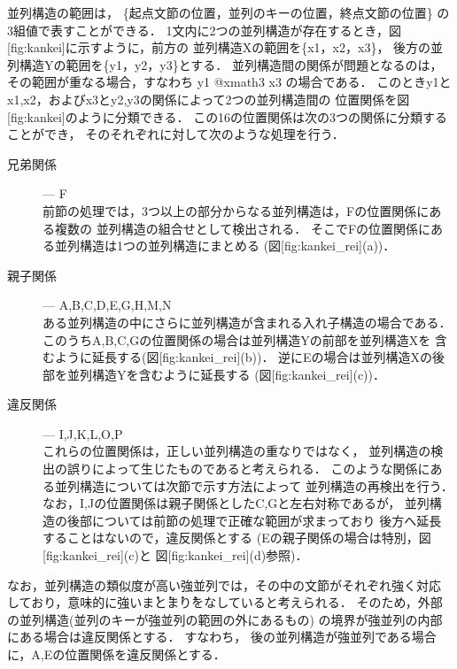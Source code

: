 並列構造の範囲は，
\{起点文節の位置，並列のキーの位置，終点文節の位置\}
の3組値で表すことができる．
1文内に2つの並列構造が存在するとき，図[fig:kankei]に示すように，前方の
並列構造Xの範囲を\{x1，x2，x3\}，
後方の並列構造Yの範囲を\{y1，y2，y3\}とする．
並列構造間の関係が問題となるのは，その範囲が重なる場合，すなわち 
y1 @xmath3 x3 
の場合である．
このときy1とx1,x2，およびx3とy2,y3の関係によって2つの並列構造間の
位置関係を図[fig:kankei]のように分類できる．
この16の位置関係は次の3つの関係に分類することができ，
そのそれぞれに対して次のような処理を行う．
\begin{description}
  \item[兄弟関係] --- F \\
前節の処理では，3つ以上の部分からなる並列構造は，Fの位置関係にある複数の
並列構造の組合せとして検出される．
そこでFの位置関係にある並列構造は1つの並列構造にまとめる
(図[fig:kankei_rei](a))．

  \item[親子関係] --- A,B,C,D,E,G,H,M,N \\
ある並列構造の中にさらに並列構造が含まれる入れ子構造の場合である．
このうちA,B,C,Gの位置関係の場合は並列構造Yの前部を並列構造Xを
含むように延長する(図[fig:kankei_rei](b))．
逆にEの場合は並列構造Xの後部を並列構造Yを含むように延長する
(図[fig:kankei_rei](c))．

  \item[違反関係] --- I,J,K,L,O,P \\
これらの位置関係は，正しい並列構造の重なりではなく，
並列構造の検出の誤りによって生じたものであると考えられる．
このような関係にある並列構造については次節で示す方法によって
並列構造の再検出を行う．
なお，I,Jの位置関係は親子関係としたC,Gと左右対称であるが，
並列構造の後部については前節の処理で正確な範囲が求まっており
後方へ延長することはないので，違反関係とする
(Eの親子関係の場合は特別，図[fig:kankei_rei](c)と
図[fig:kankei_rei](d)参照)．
\end{description}
なお，並列構造の類似度が高い強並列では，その中の文節がそれぞれ強く対応
しており，意味的に強い\.{ま}\.{と}\.{ま}\.{り}をなしていると考えられる．
そのため，外部の並列構造(並列のキーが強並列の範囲の外にあるもの)
の境界が強並列の内部にある場合は違反関係とする．
すなわち，
後の並列構造が強並列である場合に，A,Eの位置関係を違反関係とする．

{\unitlength=1mm
}

